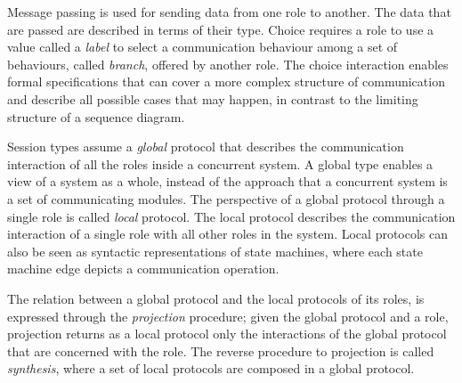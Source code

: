 Message passing is used for sending data from one role to another.
The data that are passed are described in terms of their type.
Choice requires a role to use a value called a {\em label}
to select a communication behaviour among
a set of behaviours, called {\em branch}, offered by another role.
The choice interaction enables formal specifications that can
cover a more complex structure of communication and describe all possible
cases that may happen, in contrast to the limiting structure of
a sequence diagram.

Session types assume a {\em global} protocol that describes the
communication interaction of all the roles inside a concurrent system.
A global type enables a view of a system as a whole, instead of the
approach that a concurrent system is a set of communicating modules.
The perspective of a global protocol through a single role
is called {\em local} protocol. The local protocol describes
the communication interaction of a single role with all other roles
in the system. Local protocols can also be seen as syntactic
representations of state machines, where each state machine edge
depicts a communication operation.

The relation between a global protocol and the
local protocols of its roles, is expressed
through the {\em projection} procedure;
given the global protocol and a role, projection
returns as a local protocol only the
interactions of the global protocol that are concerned with
the role.
%
The reverse procedure to projection is called {\em synthesis},
where a set of local protocols are composed %
in a global protocol.

